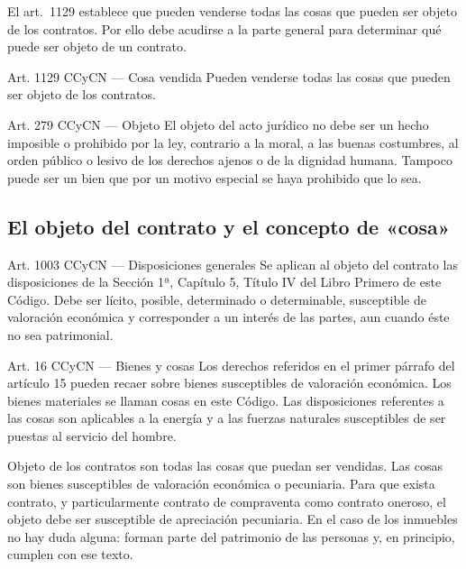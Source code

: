 \documentclass[12pt,oneside]{book}
\begin{document}
El art.\ 1129 establece que pueden venderse todas las cosas que pueden ser objeto de los contratos. Por ello debe acudirse a la parte general para determinar qué puede ser objeto de un contrato.

\begin{definition}{Art. 1129 CCyCN --- Cosa vendida}
Pueden venderse todas las cosas que pueden ser objeto de los contratos.
\end{definition}

\begin{definition}{Art. 279 CCyCN --- Objeto}
El objeto del acto jurídico no debe ser un hecho imposible o prohibido por la ley, contrario a la moral, a las buenas costumbres, al orden público o lesivo de los derechos ajenos o de la dignidad humana. Tampoco puede ser un bien que por un motivo especial se haya prohibido que lo sea.
\end{definition}

\subsection{El objeto del contrato y el concepto de «cosa»}

\begin{definition}{Art. 1003 CCyCN --- Disposiciones generales}
Se aplican al objeto del contrato las disposiciones de la Sección 1ª, Capítulo 5, Título IV del Libro Primero de este Código. Debe ser lícito, posible, determinado o determinable, susceptible de valoración económica y corresponder a un interés de las partes, aun cuando éste no sea patrimonial.
\end{definition}

\begin{definition}{Art. 16 CCyCN --- Bienes y cosas}
Los derechos referidos en el primer párrafo del artículo 15 pueden recaer sobre bienes susceptibles de valoración económica. Los bienes materiales se llaman cosas en este Código. Las disposiciones referentes a las cosas son aplicables a la energía y a las fuerzas naturales susceptibles de ser puestas al servicio del hombre.
\end{definition}

Objeto de los contratos son todas las cosas que puedan ser vendidas. Las cosas son bienes susceptibles de valoración económica o pecuniaria. Para que exista contrato, y particularmente contrato de compraventa como contrato oneroso, el objeto debe ser susceptible de apreciación pecuniaria. En el caso de los inmuebles no hay duda alguna: forman parte del patrimonio de las personas y, en principio, cumplen con ese texto.
\end{document}
